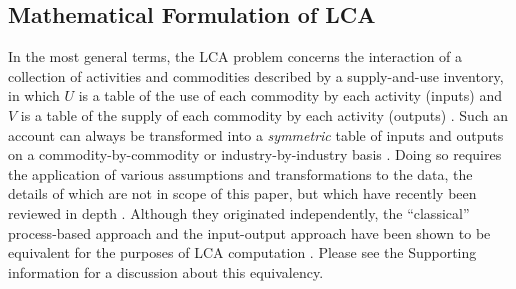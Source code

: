 \subsection{Mathematical Formulation of LCA}

In the most general terms, the LCA problem concerns the interaction of a collection of activities and commodities described by a supply-and-use inventory, in which $U$ is a table of the use of each commodity by each activity (inputs) and $V$ is a table of the supply of each commodity by each activity (outputs) \citep{Pauliuk_2015_framework}.  Such an account can always be transformed into a \textit{symmetric} table of inputs and outputs on a commodity-by-commodity or industry-by-industry basis \citep{Eurostat_2008}. Doing so requires the application of various assumptions and transformations to the data, the details of which are not in scope of this paper, but which have recently been reviewed in depth \citep{Majeau_Bettez_2014}.  Although they originated independently, the ``classical'' process-based approach and the input-output approach have been shown to be equivalent for the purposes of LCA computation \citep{Suh_JIE_2010}.  Please see the Supporting information for a discussion about this equivalency.

